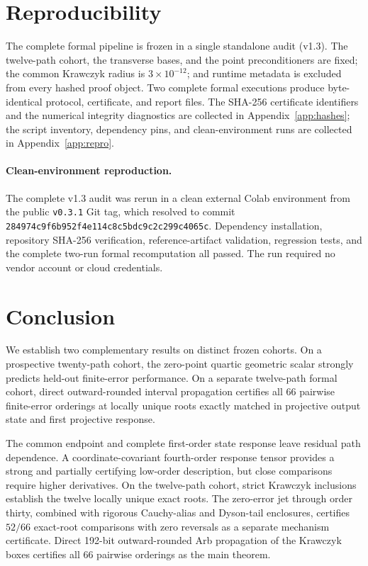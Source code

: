 \documentclass[11pt]{article}
\begin{document}
\section{Reproducibility}

The complete formal pipeline is frozen in a single standalone audit (v1.3).
The twelve-path cohort, the transverse bases, and the point preconditioners
are fixed; the common Krawczyk radius is $3\times10^{-12}$; and runtime
metadata is excluded from every hashed proof object. Two complete formal
executions produce byte-identical protocol, certificate, and report files.
The SHA-256 certificate identifiers and the numerical integrity diagnostics
are collected in Appendix~\ref{app:hashes}; the script inventory, dependency
pins, and clean-environment runs are collected in Appendix~\ref{app:repro}.

\paragraph{Clean-environment reproduction.}
The complete v1.3 audit was rerun in a clean external Colab environment from
the public \texttt{v0.3.1} Git tag, which resolved to commit
\texttt{284974c9f6b952f4e114c8c5bdc9c2c299c4065c}. Dependency installation,
repository SHA-256 verification, reference-artifact validation, regression
tests, and the complete two-run formal recomputation all passed. The run
required no vendor account or cloud credentials.

\section{Conclusion}

We establish two complementary results on distinct frozen cohorts.
On a prospective twenty-path cohort, the zero-point quartic geometric
scalar strongly predicts held-out finite-error performance. On a
separate twelve-path formal cohort, direct outward-rounded interval
propagation certifies all 66 pairwise finite-error orderings at locally
unique roots exactly matched in projective output state and first
projective response.

The common endpoint and complete first-order state response leave residual
path dependence. A coordinate-covariant fourth-order response tensor provides
a strong and partially certifying low-order description, but close
comparisons require higher derivatives. On the twelve-path cohort, strict
Krawczyk inclusions establish the twelve locally unique exact roots. The
zero-error jet through order thirty, combined with rigorous Cauchy-alias and
Dyson-tail enclosures, certifies $52/66$ exact-root comparisons with zero
reversals as a separate mechanism certificate. Direct 192-bit outward-rounded
Arb propagation of the Krawczyk boxes certifies all $66$ pairwise orderings
as the main theorem.
\end{document}

